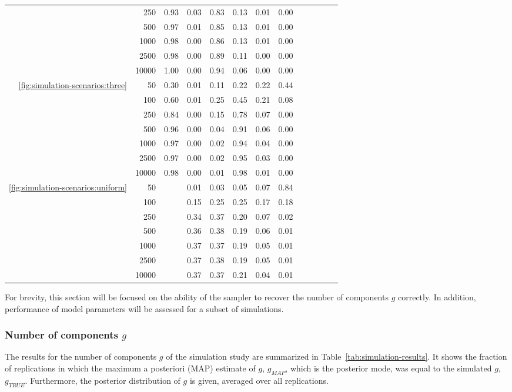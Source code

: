 \begin{table}
\begin{tabular}{rrcrrrrrrrrrr}
		& 250 & 0.93 & 0.03 & 0.83 & 0.13 & 0.01 & 0.00 \\ 
		& 500 & 0.97 & 0.01 & 0.85 & 0.13 & 0.01 & 0.00 \\ 
		& 1000 & 0.98 & 0.00 & 0.86 & 0.13 & 0.01 & 0.00 \\ 
		& 2500 & 0.98 & 0.00 & 0.89 & 0.11 & 0.00 & 0.00 \\ 
		& 10000 & 1.00 & 0.00 & 0.94 & 0.06 & 0.00 & 0.00 \\ 
		\hline
		\ref{fig:simulation-scenarios:three} & 50 & 0.30 & 0.01 & 0.11 & 0.22 & 0.22 & 0.44 \\ 
		& 100 & 0.60 & 0.01 & 0.25 & 0.45 & 0.21 & 0.08 \\ 
		& 250 & 0.84 & 0.00 & 0.15 & 0.78 & 0.07 & 0.00 \\ 
		& 500 & 0.96 & 0.00 & 0.04 & 0.91 & 0.06 & 0.00 \\ 
		& 1000 & 0.97 & 0.00 & 0.02 & 0.94 & 0.04 & 0.00 \\ 
		& 2500 & 0.97 & 0.00 & 0.02 & 0.95 & 0.03 & 0.00 \\ 
		& 10000 & 0.98 & 0.00 & 0.01 & 0.98 & 0.01 & 0.00 \\
		\hline
		\ref{fig:simulation-scenarios:uniform} & 50 & & 0.01 & 0.03 & 0.05 & 0.07 & 0.84 \\ 
		& 100 &  & 0.15 & 0.25 & 0.25 & 0.17 & 0.18 \\ 
		& 250 &  & 0.34 & 0.37 & 0.20 & 0.07 & 0.02 \\ 
		& 500 &  & 0.36 & 0.38 & 0.19 & 0.06 & 0.01 \\ 
		& 1000 &  & 0.37 & 0.37 & 0.19 & 0.05 & 0.01 \\ 
		& 2500 &  & 0.37 & 0.38 & 0.19 & 0.05 & 0.01 \\ 
		& 10000 &  & 0.37 & 0.37 & 0.21 & 0.04 & 0.01 \\ 
		\hline
	\end{tabular}
\end{table}

For brevity, this section will be focused on the ability of the sampler to recover the number of components $g$ correctly. In addition, performance of model parameters will be assessed for a subset of simulations.

\subsubsection{Number of components $g$} 

The results for the number of components $g$ of the simulation study are summarized in Table~\ref{tab:simulation-results}. It shows the fraction of replications in which the maximum a posteriori (MAP) estimate of $g$, $g_{MAP}$, which is the posterior mode, was equal to the simulated $g$, $g_{TRUE}$. Furthermore, the posterior distribution of $g$ is given, averaged over all replications. 


